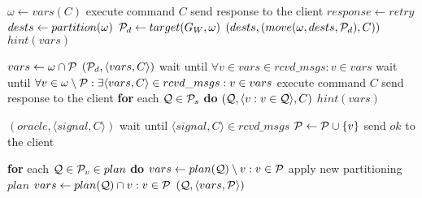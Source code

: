 \begin{algorithm}[h!]
\small

\begin{distribalgo}[1]

	\STATE $\omega \leftarrow vars(C)$
		\STATE execute command $C$
		\STATE send response to the client
	\ELSE
			\STATE $response \leftarrow retry$
		\ELSE
			\STATE $dests \leftarrow partition(\omega)$
			\STATE $\mathcal{P}_d \leftarrow target(G_W, \omega)$
			\STATE \amcast$(dests, (move(\omega,dests,\mathcal{P}_d), C))$
			\STATE $hint(vars)$
		\ENDIF
	\ENDIF
\ENDINDENT

\vspace{1.0mm}
		\STATE $vars \leftarrow \omega \cap \mathcal{P}$
		\STATE \rmcast$(\mathcal{P}_d, \langle vars, C \rangle)$
		\STATE wait until $\forall v \in vars \in rcvd\_msgs : v \in vars$
		\STATE wait until $\forall v \in \omega \setminus \mathcal{P}: \exists \langle vars, C \rangle \in rcvd\_msgs :v \in vars$
		\STATE execute command $C$
		\STATE send response to the client
		\STATE \textbf{for} each $\mathcal{Q} \in \mathcal{P}_s$ \textbf{do} \rmcast$(\mathcal{Q}, \langle v:v \in \mathcal{Q} \rangle, C)$
		\STATE $hint(vars)$
	\ENDIF
\ENDINDENT

\vspace{1.0mm}
	\STATE \rmcast$(oracle, \langle signal, C \rangle )$
	\STATE wait until $\langle signal, C \rangle \in rcvd\_msgs$
	\STATE $\mathcal{P} \leftarrow \mathcal{P} \cup \{v\}$
	\STATE send $ok$ to the client
\ENDINDENT

\vspace{1.0mm}
	\STATE \textbf{for} each $\mathcal{Q} \in \mathcal{P}_v \in plan$ \textbf{do} 
			\STATE $vars \leftarrow plan(\mathcal{Q}) \setminus v:v \in \mathcal{P}$
				\STATE apply new partitioning $plan$
			\ENDIF
		\ELSE 
			\STATE $vars \leftarrow plan(\mathcal{Q}) \cap v:v \in \mathcal{P}$
			\STATE \rmcast$(\mathcal{Q}, \langle vars, \mathcal{P} \rangle )$
		\ENDIF
\ENDINDENT


\end{distribalgo}
\end{algorithm}
